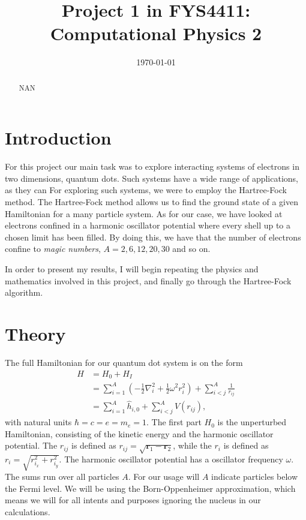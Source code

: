 \documentclass[11pt]{article}
\title{Project 1 in FYS4411: Computational Physics 2}
\author{}
\date{\today}
\begin{document}
\maketitle

\begin{abstract}
NAN
\end{abstract}

\section{Introduction}
For this project our main task was to explore interacting systems of electrons in two dimensions, quantum dots. Such systems have a wide range of applications, as they can  For exploring such systems, we were to employ the Hartree-Fock method. The Hartree-Fock method allows us to find the ground state of a given Hamiltonian for a many particle system. As for our case, we have looked at electrons confined in a harmonic oscillator potential where every shell up to a chosen limit has been filled. By doing this, we have that the number of electrons confine to \textit{magic numbers}, $A = 2, 6, 12, 20, 30$ and so on. 

In order to present my results, I will begin repeating the physics and mathematics involved in this project, and finally go through the Hartree-Fock algorithm.


\section{Theory}
The full Hamiltonian for our quantum dot system is on the form
\begin{align}
	H &= H_0 + H_I \nonumber \\
	&= \sum^A_{i=1} \left( -\frac{1}{2}\nabla^2_i + \frac{1}{2}\omega^2 r^2_i \right) + \sum^A_{i<j}\frac{1}{r_{ij}} \\
	&= \sum^A_{i=1} \hat{h}_{i,0} + \sum^A_{i<j}V(r_{ij}),
	\label{eq:full-hamiltonian}
\end{align}
with natural units $\hbar = c = e = m_e = 1$. The first part $H_0$ is the unperturbed Hamiltonian, consisting of the kinetic energy and the harmonic oscillator potential. The $r_{ij}$ is defined as $r_{ij} = \sqrt{\mathbf{r}_1 - \mathbf{r}_2}$, while the $r_i$ is defined as $r_i = \sqrt{r^2_{i_x} + r^2_{i_y}}$. The harmonic oscillator potential has a oscillator frequency $\omega$. The sums run over all particles $A$. For our usage will $A$ indicate particles below the Fermi level. We will be using the Born-Oppenheimer approximation, which means we will for all intents and purposes ignoring the nucleus in our calculations.
\end{document}
